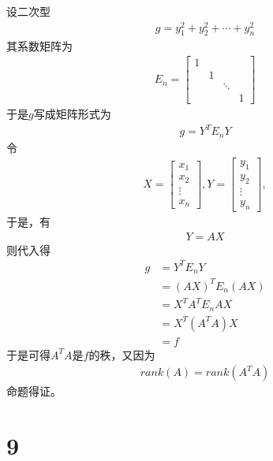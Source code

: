 \documentclass{article}
\begin{document}
设二次型
\begin{align*}
  g = y_1^2 + y_2^2 + \cdots + y_n^2
\end{align*}
其系数矩阵为
\begin{align*}
  E_n = \begin{bmatrix}
          1                 \\
           & 1              \\
           &   & \ddots     \\
           &   &        & 1
        \end{bmatrix}
\end{align*}
于是$g$写成矩阵形式为
\begin{align*}
  g = Y^T E_n Y
\end{align*}
令
\begin{align*}
  X = \begin{bmatrix}
        x_1    \\
        x_2    \\
        \vdots \\
        x_n
      \end{bmatrix},
  Y = \begin{bmatrix}
        y_1    \\
        y_2    \\
        \vdots \\
        y_n
      \end{bmatrix},
\end{align*}
于是，有
\begin{align*}
  Y = A X
\end{align*}
则代入得
\begin{align*}
  g & = Y^T E_n Y         \\
    & = (A X)^T E_n (A X) \\
    & = X^T A^T E_n A X   \\
    & = X^T (A^T A) X     \\
    & = f
\end{align*}
于是可得$A^T A$是$f$的秩，又因为
\begin{align*}
  rank(A) = rank(A^T A)
\end{align*}
命题得证。

\section*{9}
\end{document}
